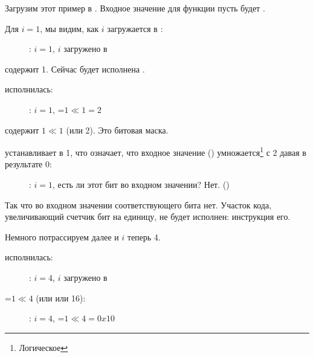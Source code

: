 ﻿\clearpage
\mysubparagraph{\olly}
\myindex{\olly}

Загрузим этот пример в \olly. 
Входное значение для функции пусть будет .

Для $i=1$, мы видим, как $i$ загружается в \ECX: 

\begin{figure}[H]
\centering
{}
\caption{\olly: $i=1$, $i$ загружено в \ECX}
\label{fig:shifts_olly1_1}
\end{figure}

\EDX содержит 1. Сейчас будет исполнена \SHL.

\clearpage
\SHL исполнилась:

\begin{figure}[H]
\centering
{}
\caption{\olly: $i=1$, \EDX=$1 \ll 1=2$}
\label{fig:shifts_olly1_2}
\end{figure}

\EDX содержит $1 \ll 1$ (или 2). Это битовая маска.

\clearpage
\AND устанавливает \ZF в 1, 
что означает, что входное значение () 
умножается\footnote{Логическое } с 2 давая в результате 0:

\begin{figure}[H]
\centering
{}
\caption{\olly: $i=1$, есть ли этот бит во входном значении? Нет.
 ()}
\label{fig:shifts_olly1_3}
\end{figure}

Так что во входном значении соответствующего бита нет.
Участок кода, увеличивающий счетчик бит на единицу, не будет исполнен: инструкция \JZ {} его.

\clearpage
Немного потрассируем далее и $i$ теперь 4.%

\SHL исполнилась:

\begin{figure}[H]
\centering
{}
\caption{\olly: $i=4$, $i$ загружено в \ECX}
\label{fig:shifts_olly4_1}
\end{figure}

\clearpage
\EDX=$1 \ll 4$ (или  или 16): 

\begin{figure}[H]
\centering
{}
\caption{\olly: $i=4$, \EDX=$1 \ll 4=0x10$}
\label{fig:shifts_olly4_2}
\end{figure}


